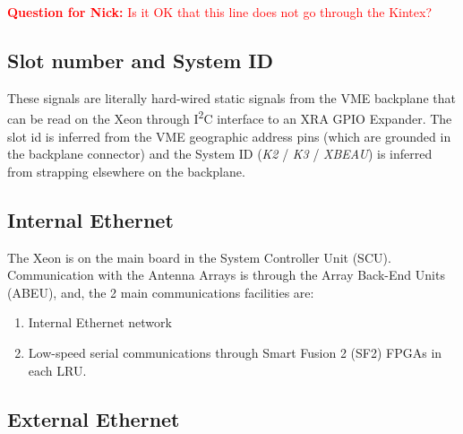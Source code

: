 \documentclass[12pt]{article}
\begin{document}
\textcolor{red}{\textbf{Question for Nick:} Is it OK that this line does not go through the Kintex?}



\subsection{Slot number and System ID}
\label{section:slot_system_id}

These signals are literally hard-wired static signals from the VME backplane that can be read on the Xeon through I\textsuperscript{2}C interface to an XRA GPIO Expander.
The slot id is inferred from the VME geographic address pins (which are grounded in the backplane connector) and the System ID (\textit{K2} / \textit{K3} / \textit{XBEAU}) is inferred from strapping elsewhere on the backplane.


\subsection{Internal Ethernet}
\label{section:internal_ethernet}

The Xeon is on the main board in the System Controller Unit (SCU).  Communication with the Antenna Arrays is through the Array Back-End Units (ABEU), and, the 2 main communications facilities are:

\begin{enumerate}
    \item Internal Ethernet network 
    \item Low-speed serial communications through Smart Fusion 2 (SF2) FPGAs in each LRU.
\end{enumerate}




\subsection{External Ethernet}
\label{section:external_ethernet}
\end{document}
